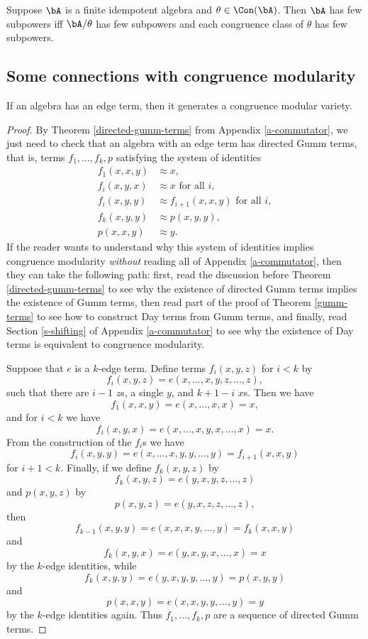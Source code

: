 \begin{cor} Suppose $\bA$ is a finite idempotent algebra and $\theta \in \Con(\bA)$. Then $\bA$ has few subpowers iff $\bA/\theta$ has few subpowers and each congruence class of $\theta$ has few subpowers.
\end{cor}


\subsection{Some connections with congruence modularity}

\begin{thm} If an algebra has an edge term, then it generates a congruence modular variety.
\end{thm}
\begin{proof} By Theorem \ref{directed-gumm-terms} from Appendix \ref{a-commutator}, we just need to check that an algebra with an edge term has directed Gumm terms, that is, terms $f_1, ..., f_k, p$ satisfying the system of identities
\begin{align*}
f_1(x,x,y) &\approx x,\\
f_i(x,y,x) &\approx x\text{ for all }i,\\
f_i(x,y,y) &\approx f_{i+1}(x,x,y)\text{ for all }i,\\
f_k(x,y,y) &\approx p(x,y,y),\\
p(x,x,y) &\approx y.
\end{align*}
If the reader wants to understand why this system of identities implies congruence modularity \emph{without} reading all of Appendix \ref{a-commutator}, then they can take the following path: first, read the discussion before Theorem \ref{directed-gumm-terms} to see why the existence of directed Gumm terms implies the existence of Gumm terms, then read part of the proof of Theorem \ref{gumm-terms} to see how to construct Day terms from Gumm terms, and finally, read Section \ref{s-shifting} of Appendix \ref{a-commutator} to see why the existence of Day terms is equivalent to congruence modularity.

Suppose that $e$ is a $k$-edge term. Define terms $f_i(x,y,z)$ for $i < k$ by
\[
f_i(x,y,z) = e(x,...,x,y,z,...,z),
\]
such that there are $i-1$ $z$s, a single $y$, and $k+1-i$ $x$s. Then we have
\[
f_1(x,x,y) = e(x,...,x,x) = x,
\]
and for $i < k$ we have
\[
f_i(x,y,x) = e(x,...,x,y,x,...,x) = x.
\]
From the construction of the $f_i$s we have
\[
f_i(x,y,y) = e(x,...,x,y,y,...,y) = f_{i+1}(x,x,y)
\]
for $i+1 < k$. Finally, if we define $f_k(x,y,z)$ by
\[
f_k(x,y,z) = e(y,x,y,z,...,z)
\]
and $p(x,y,z)$ by
\[
p(x,y,z) = e(y,x,z,z,...,z),
\]
then
\[
f_{k-1}(x,y,y) = e(x,x,x,y,...,y) = f_k(x,x,y)
\]
and
\[
f_k(x,y,x) = e(y,x,y,x,...,x) = x
\]
by the $k$-edge identities, while
\[
f_k(x,y,y) = e(y,x,y,y,...,y) = p(x,y,y)
\]
and
\[
p(x,x,y) = e(x,x,y,y,...,y) = y
\]
by the $k$-edge identities again. Thus $f_1, ..., f_k, p$ are a sequence of directed Gumm terms.
\end{proof}

